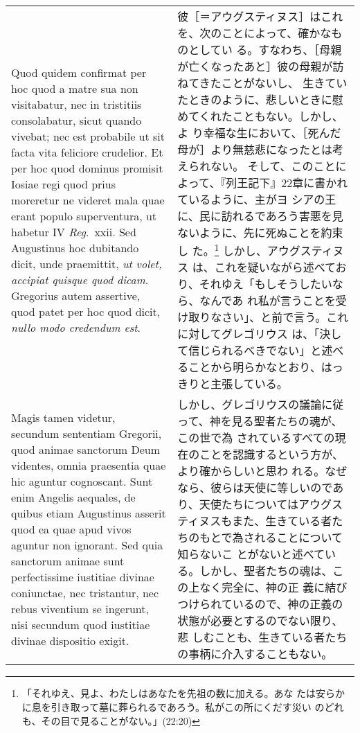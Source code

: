 \documentclass[10pt]{jsarticle} %
\begin{document}
\begin{longtable}{p{21em}p{21em}}
\\


Quod quidem confirmat per hoc quod a matre sua non visitabatur, nec in
tristitiis consolabatur, sicut quando vivebat; nec est probabile ut
sit facta vita feliciore crudelior. Et per hoc quod dominus promisit
Iosiae regi quod prius moreretur ne videret mala quae erant populo
superventura, ut habetur IV {\it Reg}.~{\sc xxii}. Sed Augustinus hoc
dubitando dicit, unde praemittit, {\it ut volet, accipiat quisque quod
dicam}. Gregorius autem assertive, quod patet per hoc quod dicit, {\it
nullo modo credendum est}.


&

彼［＝アウグスティヌス］はこれを、次のことによって、確かなものとしてい
る。すなわち、［母親が亡くなったあと］彼の母親が訪ねてきたことがないし、
生きていたときのように、悲しいときに慰めてくれたこともない。しかし、よ
り幸福な生において、［死んだ母が］より無慈悲になったとは考えられない。
そして、このことによって、『列王記下』22章に書かれているように、主がヨ
シアの王に、民に訪れるであろう害悪を見ないように、先に死ぬことを約束し
た。\footnote{「それゆえ、見よ、わたしはあなたを先祖の数に加える。あな
たは安らかに息を引き取って墓に葬られるであろう。私がこの所にくだす災い
のどれも、その目で見ることがない。」(22:20)} しかし、アウグスティヌス
は、これを疑いながら述べており、それゆえ「もしそうしたいなら、なんであ
れ私が言うことを受け取りなさい」、と前で言う。これに対してグレゴリウス
は、「決して信じられるべきでない」と述べることから明らかなとおり、はっ
きりと主張している。
\\




Magis tamen videtur, secundum sententiam Gregorii, quod animae
sanctorum Deum videntes, omnia praesentia quae hic aguntur
cognoscant. Sunt enim Angelis aequales, de quibus etiam Augustinus
asserit quod ea quae apud vivos aguntur non ignorant. Sed quia
sanctorum animae sunt perfectissime iustitiae divinae coniunctae, nec
tristantur, nec rebus viventium se ingerunt, nisi secundum quod
iustitiae divinae dispositio exigit.


&

しかし、グレゴリウスの議論に従って、神を見る聖者たちの魂が、この世で為
されているすべての現在のことを認識するという方が、より確からしいと思わ
れる。なぜなら、彼らは天使に等しいのであり、天使たちについてはアウグス
ティヌスもまた、生きている者たちのもとで為されることについて知らないこ
とがないと述べている。しかし、聖者たちの魂は、この上なく完全に、神の正
義に結びつけられているので、神の正義の状態が必要とするのでない限り、悲
しむことも、生きている者たちの事柄に介入することもない。


\end{longtable}
\end{document}
